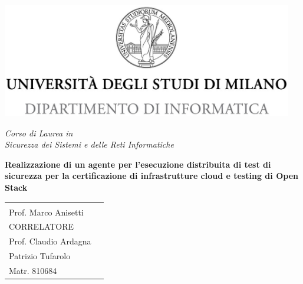\begin{titlepage}
  \begin{center}
    \includegraphics[height=5.0cm]{immagini/unimi.jpg}
    
    \vspace*{.4cm}
    {\Large 
      \emph{Corso di Laurea in\\[.3cm]
         Sicurezza dei Sistemi e delle Reti Informatiche}
    }
    \vfill
    \begin{LARGE}
      \textbf{Realizzazione di un agente per l'esecuzione
        distribuita di test di sicurezza per la certificazione di infrastrutture cloud
        e testing di Open Stack}
    \end{LARGE}
    
    \vfill
    \begin{minipage}{.99\linewidth}
      \begin{tabular}{l r}
        \begin{minipage}{.4\linewidth}
          \begin{flushleft}
            {\large
              RELATORE\\[.3cm]
              Prof. Marco Anisetti\\[.4cm]
              CORRELATORE\\[.3cm]
              Prof. Claudio Ardagna
            }

          \end{flushleft}
        \end{minipage}
        &
        \begin{minipage}{.6\linewidth}
          \begin{flushright}
            {\large
              TESI DI LAUREA DI\\[.3cm]
              Patrizio Tufarolo\\[.45cm]
              Matr. 810684
            }
          \end{flushright}
        \end{minipage}
      \end{tabular}
    \end{minipage}
    

\end{center}
\end{titlepage}
